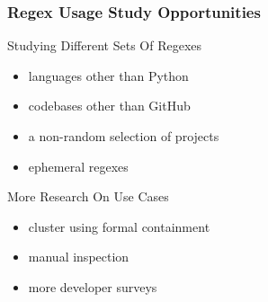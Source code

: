 \begin{frame}
\frametitle{Regex Usage Study Opportunities}

\begin{block}{\begin{Large}Studying Different Sets Of Regexes\end{Large}}
\begin{itemize}
\item languages other than Python
\item codebases other than GitHub
\item a non-random selection of projects
\item ephemeral regexes
\end{itemize}
\end{block}


\begin{block}{\begin{Large}More Research On Use Cases\end{Large}}
\begin{itemize}
\item cluster using formal containment
\item manual inspection
\item more developer surveys
\end{itemize}
\end{block}

\end{frame}




